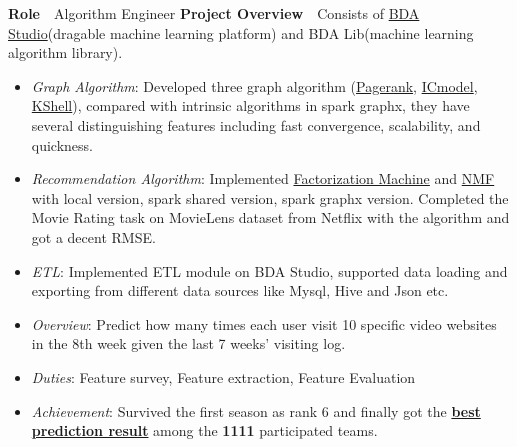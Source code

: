 \documentclass[13pt,a4paper]{resume}
\begin{document}

\textbf{Role}\ \ Algorithm Engineer
\newline
\textbf{Project Overview}\ \  Consists of \href{http://bda.space:18080}{BDA Studio}(dragable machine learning platform) and BDA Lib(machine learning algorithm library).
\begin{itemize}
  \item {\emph{Graph Algorithm}}: Developed three graph algorithm (\href{http://bda.space:18080/BDAStudioMonitor.html?job=0000001-160229111630187-oozie-oozi-W}{Pagerank}, \href{http://bda.space:18080/BDAStudioMonitor.html?job=0000015-160229111630187-oozie-oozi-W}{ICmodel}, \href{http://bda.space:18080/BDAStudioMonitor.html?job=0000206-151222123224608-oozie-oozi-W}{KShell}), compared with intrinsic algorithms in spark graphx, they have several distinguishing features including fast convergence, scalability, and quickness.
  \item {\emph{Recommendation Algorithm}}: Implemented \href{http://bda.space:18080/BDAStudioMonitor.html?job=0000009-160229111630187-oozie-oozi-W}{Factorization Machine}  and \href{http://bda.space:18080/BDAStudioMonitor.html?job=0000009-160229111630187-oozie-oozi-W}{NMF} with local version, spark shared version, spark graphx version. Completed the Movie Rating task on MovieLens dataset from Netflix with the algorithm and got a decent RMSE.
  \item {\emph{ETL}}: Implemented ETL module on BDA Studio, supported data loading and exporting from different data sources like Mysql, Hive and Json etc.
  \end{itemize}

\begin{itemize}
\item {\emph{Overview}}: Predict how many times each user visit 10 specific video websites in the 8th week given the last 7 weeks' visiting log.
\item {\emph{Duties}}: Feature survey, Feature extraction, Feature Evaluation
  \item {\emph{Achievement}}: Survived the first season as rank 6 and finally got the {\textbf{\href{http://bdg.ctyun.cn/algr_detail/PLXBy500006w?pageIndex=al_info}{best prediction result}}} among the {\textbf{1111}} participated teams.
\end{itemize}
\end{document}
